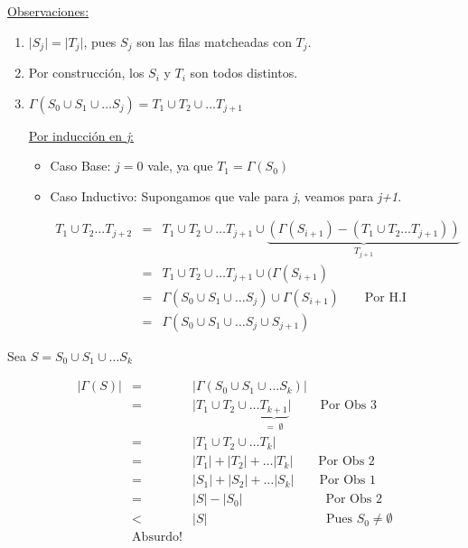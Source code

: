 \documentclass[12pt,a4paper]{report}
\newcounter{neq}
\begin{document}
			\vspace{5mm}
			\underline{Observaciones:}
			\begin{enumerate}
				\item $\lvert S_{j} \rvert = \lvert T_{j} \rvert$, pues $S_{j}$ son las filas matcheadas con $T_{j}$.
				\item Por construcción, los $S_{i}$ y $T_{i}$ son todos distintos.
				\item $\Gamma(S_{0} \cup S_{1} \cup \dotsc S_{j}) = T_{1} \cup T_{2} \cup \dotsc T_{j+1}$

					\underline{Por inducción en \textit{j}:}
					\begin{itemize}
						\item Caso Base: $j = 0$ vale, ya que $T_{1} = \Gamma(S_{0})$
						\item Caso Inductivo: Supongamos que vale para \textit{j}, veamos para \textit{j+1}.

						\begin{eqnarray}
							\nonumber T_{1} \cup T_{2} \dotsc T_{j+2} &=& T_{1} \cup T_{2} \cup \dotsc T_{j+1} \cup \underbrace{(\Gamma(S_{i+1}) - (T_{1} \cup T_{2} \dotsc T_{j+1}))}_{T_{j+1}} \\
							\nonumber &=& T_{1} \cup T_{2} \cup \dotsc T_{j+1} \cup (\Gamma(S_{i+1}) \\
							\nonumber &=& \Gamma(S_{0} \cup S_{1} \cup \dotsc S_{j}) \cup \Gamma(S_{i+1}) \qquad \text{Por H.I} \\
							\nonumber &=& \Gamma(S_{0} \cup S_{1} \cup \dotsc S_{j} \cup S_{j+1})
						\end{eqnarray}
					\end{itemize}
				\end{enumerate}

					Sea $S = S_{0} \cup S_{1} \cup \dotsc S_{k}$

					\begin{eqnarray}
						\nonumber \lvert \Gamma(S) \rvert &=& \lvert \Gamma(S_{0} \cup S_{1} \cup \dotsc S_{k}) \rvert \\
						\nonumber &=& \lvert T_{1} \cup T_{2} \cup \dotsc \underbrace{T_{k+1}}_{= \; \emptyset} \rvert \qquad \; \text{Por Obs 3} \\
						\nonumber &=& \lvert T_{1} \cup T_{2} \cup \dotsc T_{k} \rvert \\
						\nonumber &=& \lvert T_{1} \rvert + \lvert T_{2} \rvert + \dotsc \lvert T_{k} \rvert \qquad \text{Por Obs 2} \\
						\nonumber &=& \lvert S_{1} \rvert + \lvert S_{2} \rvert + \dotsc \lvert S_{k} \rvert \qquad \text{Por Obs 1} \\
						\nonumber &=& \lvert S \rvert - \lvert S_{0} \rvert \qquad \qquad \qquad \; \; \text{Por Obs 2} \\
						\nonumber &<& \lvert S \rvert \qquad \qquad \qquad \qquad \; \; \; \; \;\text{Pues } S_{0} \neq \emptyset \\
						\nonumber & \text{Absurdo!} &
					\end{eqnarray}
\end{document}

